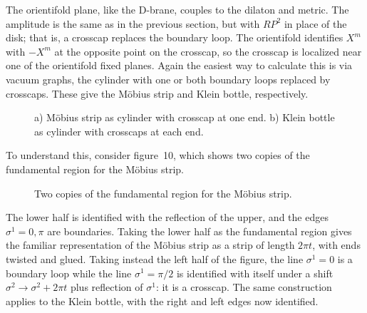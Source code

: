 The orientifold plane, like the D-brane, couples to the dilaton and
metric. The amplitude is the same as in the previous section, but with
$RP^2$ in place of the disk; that is, a crosscap replaces the boundary
loop.  The orientifold identifies $X^m$ with $-X^m$ at the opposite
point on the crosscap, so the crosscap is localized near one of the
orientifold fixed planes.  Again the easiest way to calculate this is
via vacuum graphs, the cylinder with one or both boundary loops replaced
by crosscaps.  These give the M\"obius strip and Klein bottle,
respectively.
\begin{figure}
\begin{center}
\leavevmode
{}
\end{center}
\caption[]{a) M\"obius strip as cylinder with
crosscap at one end.  b) Klein bottle as cylinder with crosscaps at
each end.}
\end{figure}
To understand this, consider figure~10, which shows two copies of
the fundamental region for the M\"obius strip.
\begin{figure}
\begin{center}
\leavevmode
{}
\end{center}
\caption[]{Two copies of the fundamental region for the M\"obius strip.
}
\end{figure}
The lower half is identified with the reflection of the upper, and the
edges $\sigma^1 = 0, \pi$ are boundaries.  Taking the lower half as the
fundamental region gives the familiar representation of the M\"obius
strip as a strip of length $2\pi t$, with ends twisted and glued. 
Taking instead the left half of the figure, the line $\sigma^1 = 0$ is a
boundary loop while the line $\sigma^1 = \pi/2$ is identified with
itself under a shift
$\sigma^2 \to \sigma^2 + 2\pi t$ plus reflection of $\sigma^1$: it is a
crosscap.  The same construction applies to the Klein bottle, with the 
right and left edges now identified.

